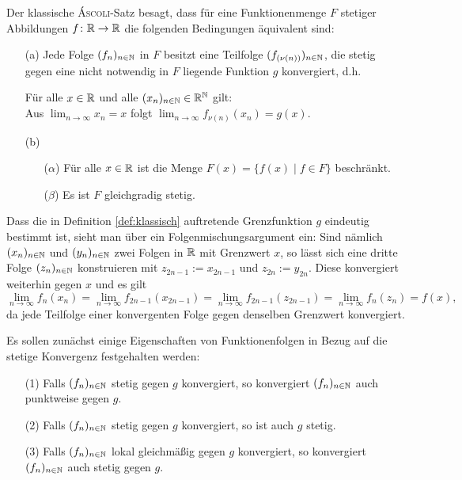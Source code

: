 \begin{defn}
  \label{def:klassisch}
  Der klassische \textsc{Áscoli}-Satz besagt, dass für eine Funktionenmenge $F$ stetiger Abbildungen $f \colon \mathbb{R} \to \mathbb{R}$ die folgenden Bedingungen äquivalent sind:
  \begin{itemize}
    \item[(a)] Jede Folge $(f_n)_{n \in \mathbb{N}}$ in $F$ besitzt eine Teilfolge $(f_{(\nu(n))})_{n \in \mathbb{N}}$, die stetig gegen eine nicht notwendig in $F$ liegende Funktion $g$ konvergiert, d.h.
      \begin{addmargin}[2em]{2em}%
        Für alle $x \in \mathbb{R}$ und alle $(x_n)_{n \in \mathbb{N}} \in \mathbb{R}^{\mathbb{N}}$ gilt: \\
        Aus $\lim_{n \to \infty} x_n = x$ folgt $\lim_{n \to \infty} f_{\nu(n)}(x_n) = g(x)$.
      \end{addmargin}
    \item[(b)]
      \begin{itemize}
        \item[($\alpha$)] Für alle $x \in \mathbb{R}$ ist die Menge $F(x) = \{ f(x) \mid f \in F\}$ beschränkt.
        \item[($\beta$)] Es ist $F$ gleichgradig stetig.
      \end{itemize}
  \end{itemize}
\end{defn}

Dass die in Definition \ref{def:klassisch} auftretende Grenzfunktion $g$ eindeutig bestimmt ist, sieht man über ein Folgenmischungsargument ein:
Sind nämlich $(x_n)_{n \in \mathbb{N}}$ und $(y_n)_{n \in \mathbb{N}}$ zwei Folgen in $\mathbb{R}$ mit Grenzwert $x$, so lässt sich eine dritte Folge $(z_n)_{n \in \mathbb{N}}$ konstruieren mit $z_{2n-1} := x_{2n-1}$ und $z_{2n} := y_{2n}$.
Diese konvergiert weiterhin gegen $x$ und es gilt 
\begin{displaymath}
   \lim_{n \to \infty} f_{n}(x_n) 
  =\lim_{n \to \infty} f_{2n-1}(x_{2n-1}) 
  =\lim_{n \to \infty} f_{2n-1}(z_{2n-1}) 
  =\lim_{n \to \infty} f_n(z_n) = f(x),
\end{displaymath}
da jede Teilfolge einer konvergenten Folge gegen denselben Grenzwert konvergiert.

Es sollen zunächst einige Eigenschaften von Funktionenfolgen in Bezug auf die stetige Konvergenz festgehalten werden:

\begin{prop}
  \label{prop:stetigkonv}
  \begin{itemize}
    \item[(1)] Falls $(f_n)_{n \in \mathbb{N}}$ stetig gegen $g$ konvergiert, so konvergiert $(f_n)_{n \in \mathbb{N}}$ auch punktweise gegen $g$.
    \item[(2)] Falls $(f_n)_{n \in \mathbb{N}}$ stetig gegen $g$ konvergiert, so ist auch $g$ stetig.
    \item[(3)] Falls $(f_n)_{n \in \mathbb{N}}$ lokal gleichmäßig gegen $g$ konvergiert, so konvergiert $(f_n)_{n \in \mathbb{N}}$ auch stetig gegen $g$.
  \end{itemize}
\end{prop}

